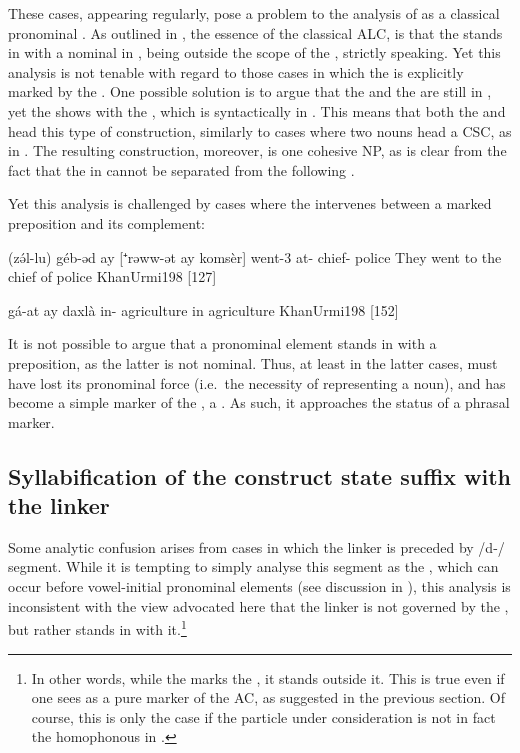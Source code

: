 These cases, appearing regularly, pose a problem to the  analysis of  as a classical pronominal \lnk*. As outlined in , the essence of the classical  ALC, is that the \lnk* stands in  with a nominal in \free*, being outside the scope of the , strictly speaking. Yet this analysis is not tenable with regard to those cases in which the \prim is explicitly marked by the \cst*. One possible solution is to argue that the \lnk* and the \prim are still in , yet the \prim shows  with the \lnk*, which is syntactically in \cst*. 
This means that both the \prim and  head this type of construction, similarly to cases where two \cst* nouns head a CSC, as in . The resulting construction, moreover, is one cohesive NP, as is clear from the fact that the \prim in \cst* cannot be separated from the following \lnk*. 

 Yet  this analysis is challenged by cases where the \lnk* intervenes between a \cst* marked preposition and its complement: 


{(zə́l-lu) géb-əd ay\cb{} [⁺rəww-ət ay\cb{} komsèr]}
{went-3\pl{} at-\cst{} \lnk\cb{} chief-\cst{} \lnk\cb{} police}
{They went to the chief of police}
{KhanUrmi}{198 {[127]}}

{gá-at ay\cb{} daxlà}
{in-\cst{} \lnk\cb{} agriculture}
{in agriculture}
{KhanUrmi}{198 {[152]}}

It is not possible to argue that a pronominal element stands in  with a preposition, as the latter is not nominal. Thus, at least in the  latter cases,  must have lost its pronominal force (i.e.\ the necessity of representing a noun), and has become a simple marker of the , a . As such, it approaches the status of a phrasal \gen* marker. 

\subsection{Syllabification of the construct state suffix with the linker} \label{ss:JUrm_resyl}

Some analytic confusion arises from cases in which the linker  is preceded by \ph/d-/ segment. While it is tempting to simply analyse this segment as the , which can occur before vowel-initial pronominal elements (see discussion in ), this analysis is  inconsistent with the view advocated here that the linker is not governed by the \prim, but rather stands in  with it.\footnote{In other words, while the \lnk* marks the \secn, it stands outside it. This is true even if one sees  as a pure marker of the AC, as suggested in the previous section. Of course, this is only the case if the particle under consideration is not in fact  the homophonous   in .} 

